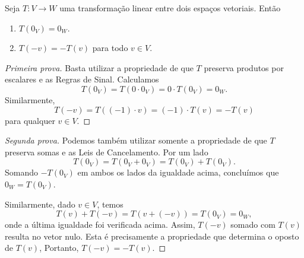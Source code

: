 \begin{theorem}
	Seja $T\colon V\to W$ uma transformação linear entre dois espaços vetoriais. Então
	\begin{enumerate}
		\item $T(0_V)=0_W$.
		\item $T(-v)=-T(v)$ para todo $v\in V$.
	\end{enumerate}
\end{theorem}

\begin{proof}[Primeira prova]
	Basta utilizar a propriedade de que $T$ preserva produtos por escalares e as Regras de Sinal. Calculamos
	\[T(0_V)=T(0\cdot 0_V)=0\cdot T(0_V)=0_W.\]
	Similarmente,
	\[T(-v)=T((-1)\cdot v)=(-1)\cdot T(v)=-T(v)\]
	para qualquer $v\in V$.
\end{proof}

\begin{proof}[Segunda prova]
	Podemos também utilizar somente a propriedade de que $T$ preserva somas e as Leis de Cancelamento. Por um lado
	\[T(0_V)=T(0_V+0_V)=T(0_V)+T(0_V).\]
	Somando $-T(0_V)$ em ambos os lados da igualdade acima, concluímos que $0_W=T(0_V)$.
	
	Similarmente, dado $v\in V$, temos
	\[T(v)+T(-v)=T(v+(-v))=T(0_V)=0_W,\]
	onde a última igualdade foi verificada acima. Assim, $T(-v)$ somado com $T(v)$ resulta no vetor nulo. Esta é precisamente a propriedade que determina o oposto de $T(v)$, Portanto, $T(-v)=-T(v)$.
\end{proof}